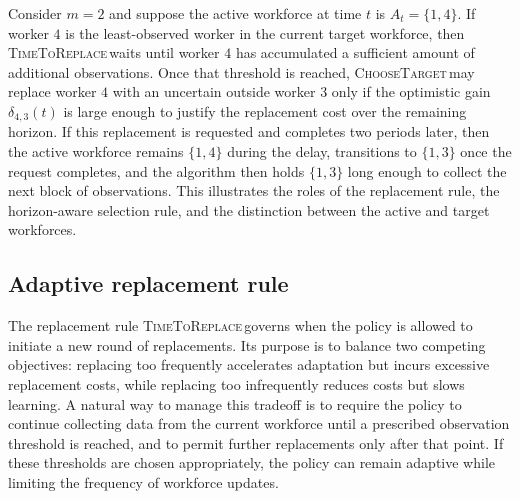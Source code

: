 \documentclass[opre,blindrev]{informs3}
\newcommand{\TimeToReplace}{\textsc{TimeToReplace}\,}
\newcommand{\ChooseTarget}{\textsc{ChooseTarget}\,}
\begin{document}
\begin{remark}
    Consider \(m=2\) and suppose the active workforce at time \(t\) is \(A_t=\{1,4\}\). If worker \(4\) is the least-observed worker in the current target workforce, then \TimeToReplace waits until worker \(4\) has accumulated a sufficient amount of additional observations. Once that threshold is reached, \ChooseTarget may replace worker \(4\) with an uncertain outside worker \(3\) only if the optimistic gain \(\delta_{4,3}(t)\) is large enough to justify the replacement cost over the remaining horizon. If this replacement is requested and completes two periods later, then the active workforce remains \(\{1,4\}\) during the delay, transitions to \(\{1,3\}\) once the request completes, and the algorithm then holds \(\{1,3\}\) long enough to collect the next block of observations. This illustrates the roles of the replacement rule, the horizon-aware selection rule, and the distinction between the active and target workforces.
\end{remark}

\vspace{-.1in}
\subsection{Adaptive replacement rule}

The replacement rule \TimeToReplace governs when the policy is allowed to initiate a new round of replacements. Its purpose is to balance two competing objectives: replacing too frequently accelerates adaptation but incurs excessive replacement costs, while replacing too infrequently reduces costs but slows learning. A natural way to manage this tradeoff is to require the policy to continue collecting data from the current workforce until a prescribed observation threshold is reached, and to permit further replacements only after that point. If these thresholds are chosen appropriately, the policy can remain adaptive while limiting the frequency of workforce updates.
\end{document}
